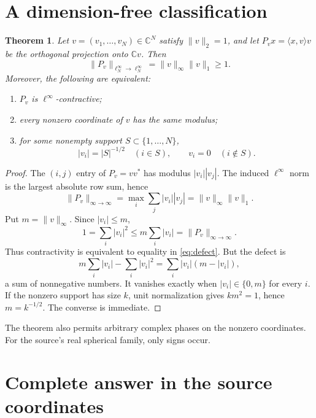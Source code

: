 \documentclass[11pt]{article}
\newtheorem{theorem}{Theorem}
\newcommand{\C}{\mathbb C}
\begin{document}
\section{A dimension-free classification}

\begin{theorem}\label{thm:general}
Let $v=(v_1,\ldots,v_N)\in\C^N$ satisfy $\lVert v\rVert_2=1$, and let
$P_vx=\langle x,v\rangle v$ be the orthogonal projection onto $\C v$.
Then
\begin{equation}\label{eq:norm}
 \lVert P_v\rVert_{\ell^\infty_N\to\ell^\infty_N}
 =\lVert v\rVert_\infty\lVert v\rVert_1\ge1.
\end{equation}
Moreover, the following are equivalent:
\begin{enumerate}
\item $P_v$ is $\ell^\infty$-contractive;
\item every nonzero coordinate of $v$ has the same modulus;
\item for some nonempty support $S\subset\{1,\ldots,N\}$,
\[
 |v_i|=|S|^{-1/2}\quad(i\in S),
 \qquad v_i=0\quad(i\notin S).
\]
\end{enumerate}
\end{theorem}

\begin{proof}
The $(i,j)$ entry of $P_v=vv^*$ has modulus $|v_i||v_j|$.  The induced
$\ell^\infty$ norm is the largest absolute row sum, hence
\[
 \lVert P_v\rVert_{\infty\to\infty}
 =\max_i\sum_j|v_i||v_j|
 =\lVert v\rVert_\infty\lVert v\rVert_1.
\]
Put $m=\lVert v\rVert_\infty$.  Since $|v_i|\le m$,
\begin{equation}\label{eq:defect}
 1=\sum_i|v_i|^2\le m\sum_i|v_i|
 =\lVert P_v\rVert_{\infty\to\infty}.
\end{equation}
Thus contractivity is equivalent to equality in \eqref{eq:defect}.  But the
defect is
\[
 m\sum_i|v_i|-\sum_i|v_i|^2
 =\sum_i |v_i|(m-|v_i|),
\]
a sum of nonnegative numbers.  It vanishes exactly when
$|v_i|\in\{0,m\}$ for every $i$.  If the nonzero support has size $k$, unit
normalization gives $km^2=1$, hence $m=k^{-1/2}$.  The converse is immediate.
\end{proof}

The theorem also permits arbitrary complex phases on the nonzero coordinates.
For the source's real spherical family, only signs occur.

\section{Complete answer in the source coordinates}
\end{document}
